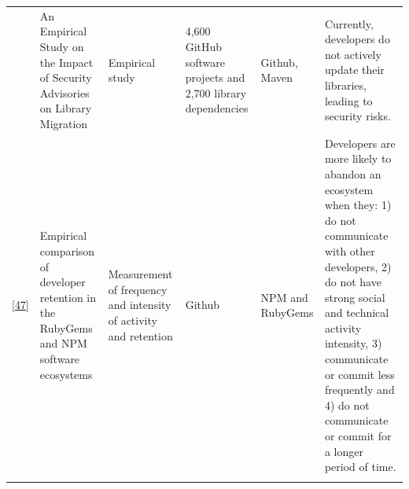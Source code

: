 \documentclass[]{book}
\begin{document}
\begin{longtable}[]{@{}llllll@{}}
\begin{minipage}[t]{0.10\columnwidth}
\end{minipage} & \begin{minipage}[t]{0.18\columnwidth}\raggedright\strut
An Empirical Study on the Impact of Security Advisories on Library
Migration\strut
\end{minipage} & \begin{minipage}[t]{0.19\columnwidth}\raggedright\strut
Empirical study\strut
\end{minipage} & \begin{minipage}[t]{0.11\columnwidth}\raggedright\strut
4,600 GitHub software projects and 2,700 library dependencies\strut
\end{minipage} & \begin{minipage}[t]{0.13\columnwidth}\raggedright\strut
Github, Maven\strut
\end{minipage} & \begin{minipage}[t]{0.11\columnwidth}\raggedright\strut
Currently, developers do not actively update their libraries, leading to
security risks.\strut
\end{minipage}\tabularnewline
\begin{minipage}[t]{0.10\columnwidth}\raggedright\strut
{[}\protect\hyperlink{ref-Constantinou2017}{47}{]}\strut
\end{minipage} & \begin{minipage}[t]{0.18\columnwidth}\raggedright\strut
Empirical comparison of developer retention in the RubyGems and NPM
software ecosystems\strut
\end{minipage} & \begin{minipage}[t]{0.19\columnwidth}\raggedright\strut
Measurement of frequency and intensity of activity and retention\strut
\end{minipage} & \begin{minipage}[t]{0.11\columnwidth}\raggedright\strut
Github\strut
\end{minipage} & \begin{minipage}[t]{0.13\columnwidth}\raggedright\strut
NPM and RubyGems\strut
\end{minipage} & \begin{minipage}[t]{0.11\columnwidth}\raggedright\strut
Developers are more likely to abandon an ecosystem when they: 1) do not
communicate with other developers, 2) do not have strong social and
technical activity intensity, 3) communicate or commit less frequently
and 4) do not communicate or commit for a longer period of time.\strut
\end{minipage}\tabularnewline
\begin{minipage}[t]{0.10\columnwidth}\raggedright\strut

\end{minipage}
\end{longtable}
\end{document}
